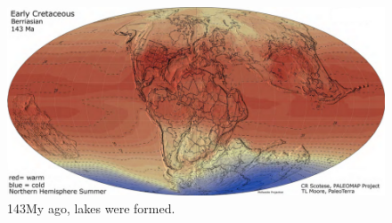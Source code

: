 \documentclass[aspectratio=169]{beamer} %
\begin{document}
{
{
\begin{frame}
	\vspace{1cm}
	\begin{figure}
	\includegraphics[scale=0.3]{images/aptianoT.png}
		\caption{143My ago, lakes were formed. \citep{Scotese2013} }
	\end{figure}
\end{frame}
}
}
\end{document}
